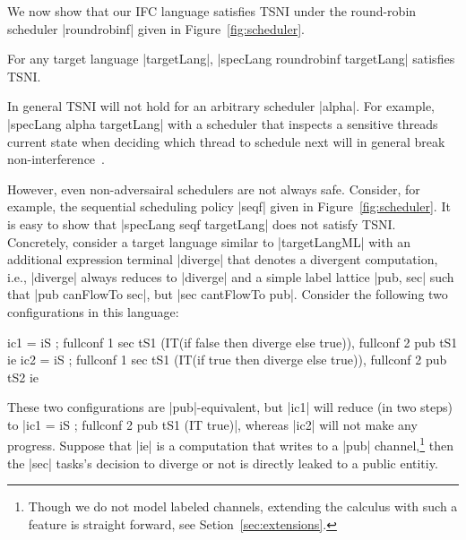 We now show that our IFC language satisfies TSNI %
%
under the round-robin scheduler
|roundrobinf| given in Figure~\ref{fig:scheduler}.

\begin{theorem}
  \label{thm:rr-tsni}
For any target language |targetLang|, |specLang roundrobinf
targetLang| satisfies TSNI.
\end{theorem}

In general TSNI will not hold for an arbitrary scheduler |alpha|.
%
For example, |specLang alpha targetLang| with a scheduler that inspects a
sensitive threads current state when deciding which thread to schedule next
will in general break non-interference~\cite{Russo:Sabelfeld:CSFW06,BartheRRS07}.
%
%

However, even non-adversairal schedulers are not always safe.
Consider, for example, the sequential scheduling policy |seqf| given in
Figure~\ref{fig:scheduler}.
%
It is easy to show that |specLang seqf targetLang| does not satisfy
TSNI.
%
Concretely, consider a target language similar to |targetLangML| with an
additional expression terminal |diverge| that denotes a divergent computation,
i.e., |diverge| always reduces to |diverge| and a simple label lattice |{pub,
sec}| such that |pub canFlowTo sec|, but |sec cantFlowTo pub|.
Consider the following two configurations in this language:
\begin{code}
ic1 = iS ; fullconf 1 sec tS1 (IT(if false then diverge else true)),  fullconf 2 pub tS1 ie
ic2 = iS ; fullconf 1 sec tS1 (IT(if true then diverge else true)),   fullconf 2 pub tS2 ie
\end{code}
These two configurations are |pub|-equivalent, but |ic1| will reduce 
(in two steps) 
to |ic1 = iS ; fullconf 2 pub tS1 (IT true)|, whereas |ic2| will not make
any progress.
%
Suppose that |ie| is a computation that writes to a |pub| channel,\footnote{
Though we do not model labeled channels, extending the calculus with such a
feature is straight forward, see Setion~\ref{sec:extensions}.}
then the |sec| tasks's decision to diverge or not is directly leaked to a
public entitiy.

